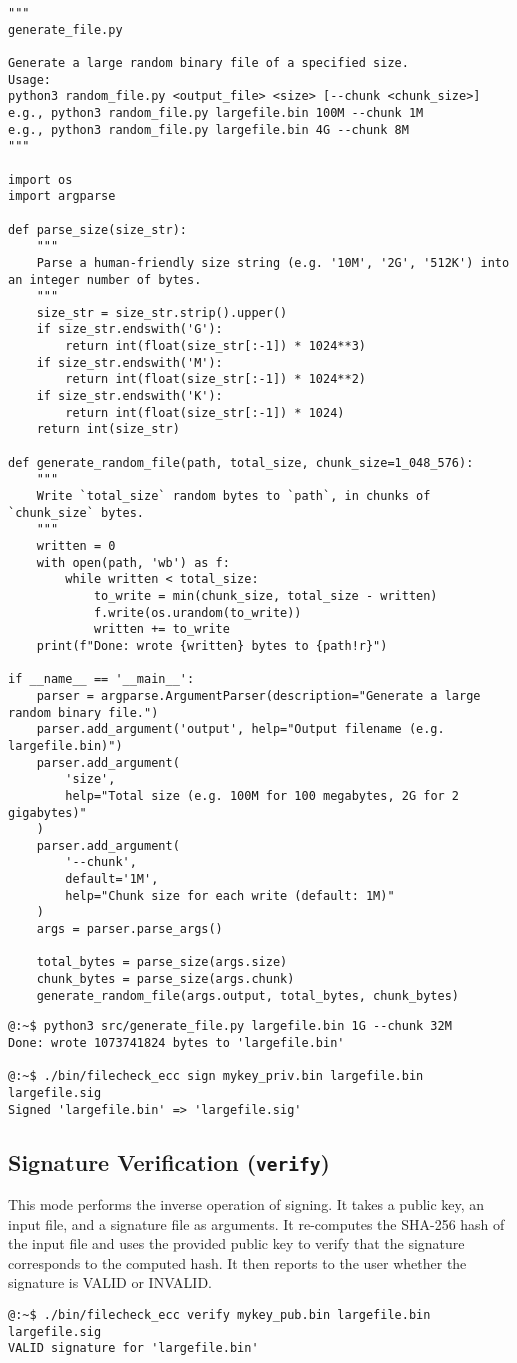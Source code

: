 \begin{lstlisting}[style=py]
"""
generate_file.py

Generate a large random binary file of a specified size.
Usage:
python3 random_file.py <output_file> <size> [--chunk <chunk_size>]
e.g., python3 random_file.py largefile.bin 100M --chunk 1M
e.g., python3 random_file.py largefile.bin 4G --chunk 8M
"""

import os
import argparse

def parse_size(size_str):
	"""
	Parse a human-friendly size string (e.g. '10M', '2G', '512K') into an integer number of bytes.
	"""
	size_str = size_str.strip().upper()
	if size_str.endswith('G'):
		return int(float(size_str[:-1]) * 1024**3)
	if size_str.endswith('M'):
		return int(float(size_str[:-1]) * 1024**2)
	if size_str.endswith('K'):
		return int(float(size_str[:-1]) * 1024)
	return int(size_str)

def generate_random_file(path, total_size, chunk_size=1_048_576):
	"""
	Write `total_size` random bytes to `path`, in chunks of `chunk_size` bytes.
	"""
	written = 0
	with open(path, 'wb') as f:
		while written < total_size:
			to_write = min(chunk_size, total_size - written)
			f.write(os.urandom(to_write))
			written += to_write
	print(f"Done: wrote {written} bytes to {path!r}")

if __name__ == '__main__':
	parser = argparse.ArgumentParser(description="Generate a large random binary file.")
	parser.add_argument('output', help="Output filename (e.g. largefile.bin)")
	parser.add_argument(
		'size',
		help="Total size (e.g. 100M for 100 megabytes, 2G for 2 gigabytes)"
	)
	parser.add_argument(
		'--chunk',
		default='1M',
		help="Chunk size for each write (default: 1M)"
	)
	args = parser.parse_args()
	
	total_bytes = parse_size(args.size)
	chunk_bytes = parse_size(args.chunk)
	generate_random_file(args.output, total_bytes, chunk_bytes)
\end{lstlisting}

\begin{lstlisting}[numbers=none]
@:~$ python3 src/generate_file.py largefile.bin 1G --chunk 32M 
Done: wrote 1073741824 bytes to 'largefile.bin'

@:~$ ./bin/filecheck_ecc sign mykey_priv.bin largefile.bin largefile.sig 
Signed 'largefile.bin' => 'largefile.sig'
\end{lstlisting}

\subsection{Signature Verification (\texttt{verify})}
This mode performs the inverse operation of signing. It takes a public key, an input file, and a signature file as arguments. It re-computes the SHA-256 hash of the input file and uses the provided public key to verify that the signature corresponds to the computed hash. It then reports to the user whether the signature is VALID or INVALID.
\begin{lstlisting}[numbers=none]
@:~$ ./bin/filecheck_ecc verify mykey_pub.bin largefile.bin largefile.sig 
VALID signature for 'largefile.bin'
\end{lstlisting}

